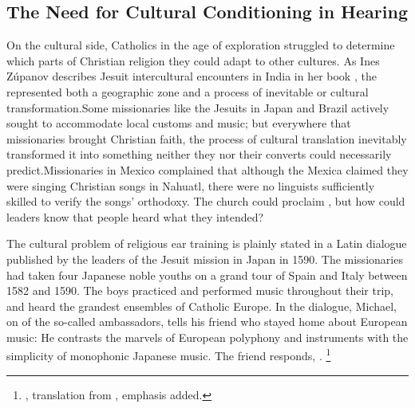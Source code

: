 \subsection{The Need for Cultural Conditioning in Hearing}

On the cultural side, Catholics in the age of exploration struggled to determine which parts of Christian religion they could adapt to other cultures.
As Ines Zúpanov describes Jesuit intercultural encounters in India in her book , the  represented both a geographic zone and a process of inevitable  or cultural transformation.\citXXX[Zupanov]
Some missionaries like the Jesuits in Japan and Brazil actively sought to accommodate local customs and music; but everywhere that missionaries brought Christian faith, the process of cultural translation inevitably transformed it into something neither they nor their converts could necessarily predict.
Missionaries in Mexico complained that although the Mexica claimed they were singing Christian songs in Nahuatl, there were no linguists sufficiently skilled to verify the songs' orthodoxy.
The church could proclaim , but how could leaders know that people heard what they intended?

The cultural problem of religious ear training is plainly stated in a Latin dialogue published by the leaders of the Jesuit mission in Japan in 1590.
The missionaries had taken four Japanese noble youths on a grand tour of Spain and Italy between 1582 and 1590.%
  \autocite{Sande:DeMissioneLegatorum}
The boys practiced and performed music throughout their trip, and heard the grandest ensembles of Catholic Europe.
In the dialogue, Michael, on of the so-called ambassadors, tells his friend who stayed home about European music:
He contrasts the marvels of European polyphony and instruments with the simplicity of monophonic Japanese music.
The friend responds, .%
  \footnote{\autocite[109--110]{Sande:DeMissioneLegatorum}, translation from \autocite[155-156]{Massarella:JapaneseTravellers}, emphasis added.}

